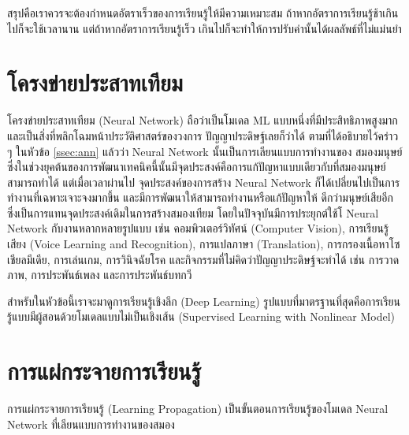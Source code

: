 สรุปคือเราควรจะต้องกำหนดอัตราเร็วของการเรียนรู้ให้มีความเหมาะสม ถ้าหากอัตราการเรียนรู้ช้าเกินไปก็จะใช้เวลานาน แต่ถ้าหากอัตราการเรียนรู้เร็ว%
เกินไปก็จะทำให้การปรับค่านั้นได้ผลลัพธ์ที่ไม่แม่นยำ

\section{โครงข่ายประสาทเทียม}
\label{sec:nn}

โครงข่ายประสาทเทียม (Neural Network) ถือว่าเป็นโมเดล ML แบบหนึ่งที่มีประสิทธิภาพสูงมากและเป็นสิ่งที่พลิกโฉมหน้าประวัติศาสตร์ของวงการ%
ปัญญาประดิษฐ์เลยก็ว่าได้ ตามที่ได้อธิบายไว้คร่าว ๆ ในหัวข้อ \ref{ssec:ann} แล้วว่า Neural Network นั้นเป็นการเลียนแบบการทำงานของ%
สมองมนุษย์ ซึ่งในช่วงยุคต้นของการพัฒนาเทคนิคนี้นั้นมีจุดประสงค์คือการแก้ปัญหาแบบเดียวกับที่สมองมนุษย์สามารถทำได้ แต่เมื่อเวลาผ่านไป%
จุดประสงค์ของการสร้าง Neural Network ก็ได้เปลี่ยนไปเป็นการทำงานที่เฉพาะเจาะจงมากขึ้น และมีการพัฒนาให้สามารถทำงานหรือแก้ปัญหาให้%
ดีกว่ามนุษย์เสียอีก ซึ่งเป็นการแทนจุดประสงค์เดิมในการสร้างสมองเทียม โดยในปัจจุบันมีการประยุกต์ใช้โ Neural Network กับงานหลากหลายรูปแบบ 
เช่น คอมพิวเตอร์วิทัศน์ (Computer Vision), การเรียนรู้เสียง (Voice Learning and Recognition), การแปลภาษา (Translation), 
การกรองเนื้อหาโซเชียลมีเดีย, การเล่นเกม, การวินิจฉัยโรค และกิจกรรมที่ไม่คิดว่าปัญญาประดิษฐ์จะทำได้ เช่น การวาดภาพ, การประพันธ์เพลง 
และการประพันธ์บทกวี

สำหรับในหัวข้อนี้เราจะมาดูการเรียนรู้เชิงลึก (Deep Learning) รูปแบบที่มาตรฐานที่สุดคือการเรียนรู้แบบมีผู้สอนด้วยโมเดลแบบไม่เป็นเชิงเส้น 
(Supervised Learning with Nonlinear Model)

\section{การแผ่กระจายการเรียนรู้}

การแผ่กระจายการเรียนรู้ (Learning Propagation) เป็นขั้นตอนการเรียนรู้ของโมเดล Neural Network ที่เลียนแบบการทำงานของสมอง 

